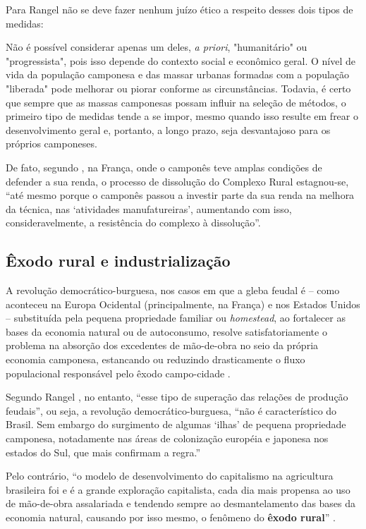 \documentclass[
	12pt,				%
	oneside,			%
	a4paper,			%
	chapter=TITLE,		%
	section=TITLE,		%
	english,			%
	brazil				%
	]{abntex2}
\begin{document}
\begin{refsection}
Para Rangel \autocite*[114]{rangel1954} não se deve fazer nenhum juízo ético a respeito
desses dois tipos de medidas:
\begin{citacao}
Não é possível considerar apenas um deles, \emph{a priori}, "humanitário" ou
"progressista", pois isso depende do contexto social e econômico geral. O nível 
de vida da população camponesa e das massar urbanas formadas com a população
"liberada" pode melhorar ou piorar conforme as circunstâncias. Todavia, é certo
que sempre que as massas camponesas possam influir na seleção de métodos, o 
primeiro tipo de medidas tende a se impor, mesmo quando isso resulte em frear
o desenvolvimento geral e, portanto, a longo prazo, seja desvantajoso para os
próprios camponeses.
\end{citacao}
De fato, segundo \textcite[p.~115]{rangel1954}, na França, onde o camponês teve amplas
condições de defender a sua renda, o processo de dissolução do Complexo Rural
estagnou-se, ``até mesmo porque o camponês passou a investir parte da sua renda
na melhora da técnica, nas `atividades manufatureiras', aumentando com isso,
consideravelmente, a resistência do complexo à dissolução''.

\hypertarget{uxeaxodo-rural-e-industrializauxe7uxe3o}{%
\subsection{Êxodo rural e industrialização}\label{uxeaxodo-rural-e-industrializauxe7uxe3o}}
\begin{citacao}
A revolução democrático-burguesa, nos casos em que a gleba feudal é -- como
aconteceu na Europa Ocidental (principalmente, na França) e nos Estados Unidos
-- substituída pela pequena propriedade familiar ou \emph{homestead}, ao
fortalecer as bases da economia natural ou de autoconsumo, resolve
satisfatoriamente o problema na absorção dos excedentes de mão-de-obra no seio
da própria economia camponesa, estancando ou reduzindo drasticamente o fluxo
populacional responsável pelo êxodo campo-cidade \cite[p.~133]{rangel1986b}.
\end{citacao}
Segundo Rangel \autocite*[133]{rangel1986b}, no entanto, ``esse tipo de superação das
relações de produção feudais'', ou seja, a revolução democrático-burguesa, ``não é
característico do Brasil. Sem embargo do surgimento de algumas `ilhas' de
pequena propriedade camponesa, notadamente nas áreas de colonização européia e
japonesa nos estados do Sul, que mais confirmam a regra.''

Pelo contrário, ``o modelo de desenvolvimento do capitalismo na agricultura
brasileira foi e é a grande exploração capitalista, cada dia mais propensa ao
uso de mão-de-obra assalariada e tendendo sempre ao desmantelamento das bases da
economia natural, causando por isso mesmo, o fenômeno do \textbf{êxodo rural}''
\autocite[134, grifo nosso]{rangel1986b}.


\end{refsection}
\end{document}
